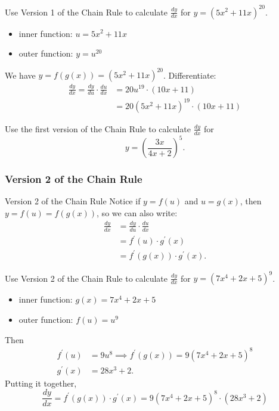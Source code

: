 \documentclass[cal1spr16Lectures.tex]{subfiles}
\begin{document}
\begin{frame}\footnotesize
\begin{ex} Use Version 1 of the Chain Rule to calculate $\frac{dy}{dx}$ for $y=(5x^2 +11x)^{20}$. \end{ex}
\begin{itemize}
\item inner function: $u=5x^2+11x$ 
\item outer function: $y=u^{20}$
\end{itemize}

\vspace{1pc}
We have $y = f(g(x)) = (5x^2 +11x)^{20}$.  Differentiate:
\begin{align*} 
\frac{dy}{dx}= \frac{dy}{du}\cdot\frac{du}{dx} &= 20u^{19} \cdot (10x+11) \\
 &=20(5x^2 +11x)^{19} \cdot (10x+11)
\end{align*}
\end{frame}

\begin{frame}
\begin{exe} Use the first version of the Chain Rule to calculate $\frac{dy}{dx}$ for 
\[y=\left( \frac{3x}{4x+2} \right)^5.\]
\end{exe}
\end{frame}

\subsubsection{Version 2 of the Chain Rule}

\begin{frame}{\small Version 2 of the Chain Rule}
Notice if $y=f(u)$ and $u=g(x)$, then $y=f(u)=f(g(x))$, so we can also write:
\begin{align*}
\frac{dy}{dx} &= \frac{dy}{du} \cdot \frac{du}{dx} \\[0.75pc]
 &= f^{\prime}(u) \cdot g^{\prime}(x) \\[0.75pc]
 &= f^{\prime}(g(x)) \cdot g^{\prime}(x).
\end{align*}
\end{frame}

\begin{frame}\footnotesize
\begin{ex} Use Version 2 of the Chain Rule to calculate $\frac{dy}{dx}$ for $y=(7x^4+2x+5)^9$. \end{ex}
\begin{itemize}
\item inner function: $g(x)=7x^4+2x+5$ 
\item outer function: $f(u)=u^9$
\end{itemize}
Then
\begin{align*}
f^{\prime}(u) &= 9u^8 \implies f^{\prime}(g(x))=9(7x^4+2x+5)^8 \\
g^{\prime}(x) &=28x^3+2.
\end{align*}
Putting it together,
\[\frac{dy}{dx}=f^{\prime}(g(x)) \cdot g^{\prime}(x) = 9(7x^4+2x+5)^8 \cdot (28x^3+2)\]
\end{frame}
\end{document}
